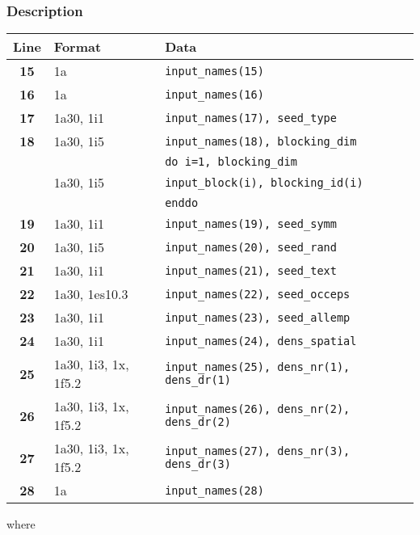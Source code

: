 \documentclass[a4paper,11pt]{article}
\begin{document}
\subsubsection*{Description}
\begin{center}
\begin{tabular}{|c|l|l|}
\hline
Line & Format & Data \\
\hline
 \textbf{15}   & 1a    & \tt input\_names(15)                        \\
 \textbf{16}   & 1a    & \tt input\_names(16)                        \\
 \textbf{17}   & 1a30, 1i1 & \tt input\_names(17), seed\_type        \\
 \textbf{18}   & 1a30, 1i5 & \tt input\_names(18), blocking\_dim     \\
               &           & \tt do i=1, blocking\_dim               \\
 \textbf{  }   & 1a30, 1i5 & \:\: \tt input\_block(i),  blocking\_id(i) \\
               &           & \tt enddo                               \\
 \textbf{19}   & 1a30, 1i1 & \tt input\_names(19), seed\_symm        \\
 \textbf{20}   & 1a30, 1i5 & \tt input\_names(20), seed\_rand        \\
 \textbf{21}   & 1a30, 1i1 & \tt input\_names(21), seed\_text        \\
 \textbf{22}   & 1a30, 1es10.3 & \tt input\_names(22), seed\_occeps  \\
 \textbf{23}   & 1a30, 1i1 & \tt input\_names(23), seed\_allemp      \\
 \textbf{24}   & 1a30, 1i1 & \tt input\_names(24), dens\_spatial     \\
 \textbf{25}   & 1a30, 1i3, 1x, 1f5.2 & \tt input\_names(25), dens\_nr(1), dens\_dr(1) \\
 \textbf{26}   & 1a30, 1i3, 1x, 1f5.2 & \tt input\_names(26), dens\_nr(2), dens\_dr(2) \\
 \textbf{27}   & 1a30, 1i3, 1x, 1f5.2 & \tt input\_names(27), dens\_nr(3), dens\_dr(3) \\
 \textbf{28}   & 1a    & \tt input\_names(28)                        \\
\hline
\end{tabular}
\end{center}
where
\end{document}
